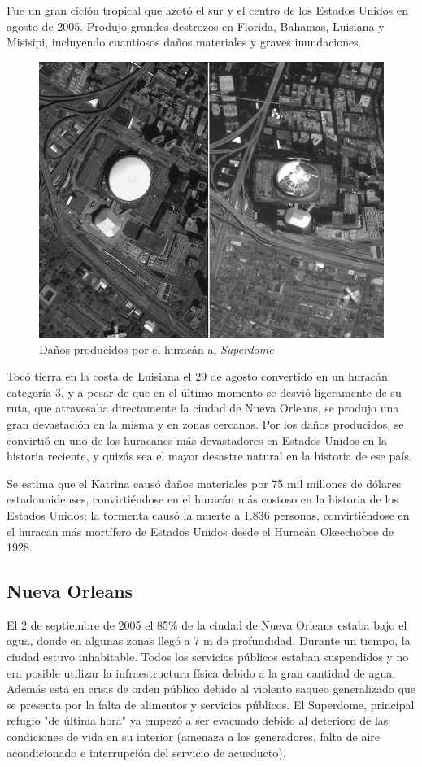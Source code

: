 Fue un gran ciclón tropical que azotó el sur y el centro de los Estados Unidos
en agosto de 2005. Produjo grandes destrozos en Florida, Bahamas, Luisiana y
Misisipi, incluyendo cuantiosos daños materiales y graves inundaciones.

\begin{figure}[H]
 \centering
 \includegraphics[width=120mm]{figuras/cap0/before_after.png}
 \caption{Daños producidos por el huracán al {\em Superdome}}
\end{figure}

Tocó tierra en la costa de Luisiana el 29 de agosto convertido en un huracán
categoría 3, y a pesar de que en el último momento se desvió ligeramente de su
ruta, que atravesaba directamente la ciudad de Nueva Orleans, se produjo una
gran devastación en la misma y en zonas cercanas. Por los daños producidos, se
convirtió en uno de los huracanes más devastadores en Estados Unidos en la
historia reciente, y quizás sea el mayor desastre natural en la historia de ese
país.

Se estima que el Katrina causó daños materiales por 75 mil millones de dólares
estadounidenses, convirtiéndose en el huracán más costoso en la historia de los
Estados Unidos; la tormenta causó la muerte a 1.836 personas, convirtiéndose en
el huracán más mortífero de Estados Unidos desde el Huracán Okeechobee de 1928.

\subsection*{Nueva Orleans}

El 2 de septiembre de 2005 el 85\% de la ciudad de Nueva Orleans estaba bajo el
agua, donde en algunas zonas llegó a 7 m de profundidad. Durante un tiempo, la
ciudad estuvo inhabitable. Todos los servicios públicos estaban suspendidos y no
era posible utilizar la infraestructura física debido a la gran cantidad de
agua. Además está en crisis de orden público debido al violento saqueo
generalizado que se presenta por la falta de alimentos y servicios públicos. El
Superdome, principal refugio "de última hora" ya empezó a ser evacuado debido al
deterioro de las condiciones de vida en su interior (amenaza a los generadores,
falta de aire acondicionado e interrupción del servicio de acueducto).

